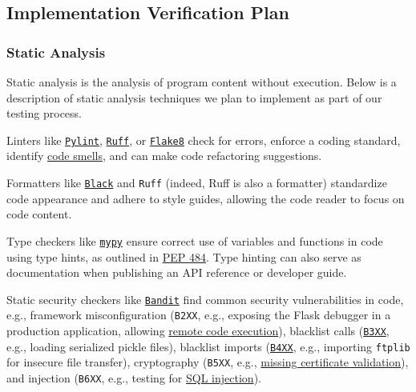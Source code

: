 \documentclass[12pt, titlepage]{article}
\begin{document}
\subsection{Implementation Verification Plan}
\subsubsection{Static Analysis}
Static analysis is the analysis of program content without execution. Below is a description of static analysis techniques we plan to implement as part of our testing process.

\begin{description}[style=unboxed,leftmargin=0cm]
  \item[Linting] Linters like \href{https://pylint.readthedocs.io/}{\texttt{Pylint}}, \href{https://docs.astral.sh/ruff/}{\texttt{Ruff}}, or \href{https://flake8.pycqa.org/en/stable/}{\texttt{Flake8}} check for errors, enforce a coding standard, identify \href{https://refactoring.guru/refactoring/smells}{code smells}, and can make code refactoring suggestions.
  
  \item[Formatting] Formatters like \href{https://black.readthedocs.io/}{\texttt{Black}} and \texttt{Ruff} (indeed, Ruff is also a formatter) standardize code appearance and adhere to style guides, allowing the code reader to focus on code content.
  
  \item[Type Checking] Type checkers like \href{https://mypy.readthedocs.io/}{\texttt{mypy}} ensure correct use of variables and functions in code using type hints, as outlined in \href{https://peps.python.org/pep-484/}{PEP 484}. Type hinting can also serve as documentation when publishing an API reference or developer guide.
  
  \item[Security Checking] Static security checkers like \href{https://bandit.readthedocs.io/}{\texttt{Bandit}} find common security vulnerabilities in code, e.g., framework misconfiguration (\texttt{B2XX}, e.g., exposing the Flask debugger in a production application, allowing \href{https://flask.palletsprojects.com/en/stable/quickstart/#debug-mode:~:text=Warning}{remote code execution}), blacklist calls (\href{https://bandit.readthedocs.io/en/latest/blacklists/blacklist_calls.html}{\texttt{B3XX}}, e.g., loading serialized pickle files), blacklist imports (\href{https://bandit.readthedocs.io/en/latest/blacklists/blacklist_imports.html}{\texttt{B4XX}}, e.g., importing \texttt{ftplib} for insecure file transfer), cryptography (\texttt{B5XX}, e.g., \href{https://bandit.readthedocs.io/en/latest/plugins/b501_request_with_no_cert_validation.html}{missing certificate validation}), and injection (\texttt{B6XX}, e.g., testing for \href{https://bandit.readthedocs.io/en/latest/plugins/b608_hardcoded_sql_expressions.html}{SQL injection}).
  

\end{description}
\end{document}
